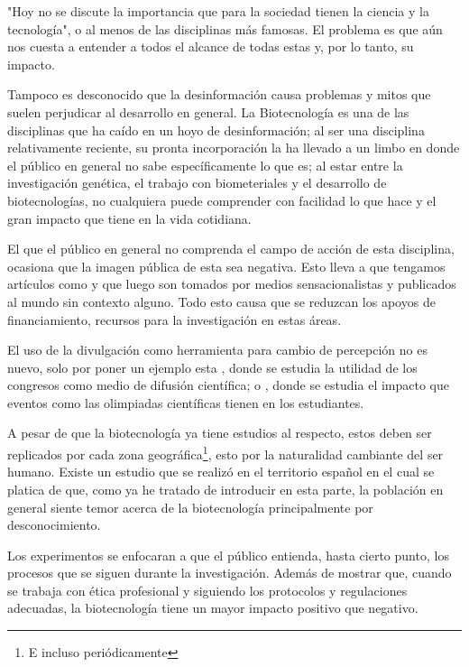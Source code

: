 \documentclass[12pt]{article}
\begin{document}
	\par "Hoy no se discute la importancia que para la sociedad tienen la ciencia y la tecnología"\cite{CC}, o al menos de las disciplinas más famosas. El problema es que aún nos cuesta a entender a todos el alcance de todas estas y, por lo tanto, su impacto.	
	\par Tampoco es desconocido que la desinformación causa problemas y mitos que suelen perjudicar al desarrollo en general. La Biotecnología es una de las disciplinas que ha caído en un hoyo de desinformación; al ser una disciplina relativamente reciente, su pronta incorporación la ha llevado a un limbo en donde el público en general no sabe específicamente lo que es; al estar entre la investigación genética, el trabajo con biometeriales y el desarrollo de biotecnologías, no cualquiera puede comprender con facilidad lo que hace y el gran impacto que tiene en la vida cotidiana.
	\par El que el público en general no comprenda el campo de acción de esta disciplina, ocasiona que la imagen pública de esta sea negativa. Esto lleva a que tengamos artículos como \cite{filos} y \cite{mTransgenicos} que luego son tomados por medios sensacionalistas y publicados al mundo sin contexto alguno. Todo esto causa que se reduzcan los apoyos de financiamiento, recursos para la investigación en estas áreas.
	\par El uso de la divulgación como herramienta para cambio de percepción no es nuevo, solo por poner un ejemplo esta \cite{utilidad congresos}, donde se estudia la utilidad de los congresos como medio de difusión científica; o \cite{olimpiadas}, donde se estudia el impacto que eventos como las olimpiadas científicas tienen en los estudiantes.
	\par A pesar de que la biotecnología ya tiene estudios al respecto, estos deben ser replicados por cada zona geográfica\footnote{E incluso periódicamente}, esto por la naturalidad cambiante del ser humano. Existe un estudio que se realizó en el territorio español \cite{bio en espania} en el cual se platica de que, como ya he tratado de introducir en esta parte, la población en general siente temor acerca de la biotecnología principalmente por desconocimiento.
	\par Los experimentos se enfocaran a que el público entienda, hasta cierto punto, los procesos que se siguen durante la investigación. Además de mostrar que, cuando se trabaja con ética profesional y siguiendo los protocolos y regulaciones adecuadas, la biotecnología tiene un mayor impacto positivo que negativo. 
\end{document}
